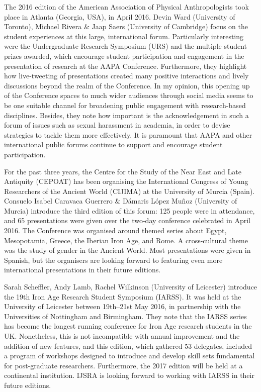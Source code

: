 \IJSRAseparator
{}
The 2016 edition of the American Association of Physical Anthropologists took place in Atlanta (Georgia, USA), in April 2016. 
Devin Ward (University of Toronto), Michael Rivera \& Jaap Saers (University of Cambridge) focus on the student experiences at this large, international forum. Particularly interesting were the Undergraduate Research Symposium (URS) and the multiple student prizes awarded, which encourage student participation and engagement in the presentation of research at the AAPA Conference. Furthermore, they highlight how live-tweeting of presentations created many positive interactions and lively discussions beyond the realm of the Conference. In my opinion, this opening up of the Conference spaces to much wider audiences through social media seems to be one suitable channel for broadening public engagement with research-based disciplines. Besides, they note how important is the acknowledgement in such a forum of issues such as sexual harassment in academia, in order to devise strategies to tackle them more effectively. It is paramount that AAPA and other international public forums continue to support and encourage student participation.

For the past three years, the Centre for the Study of the Near East and Late Antiquity (CEPOAT) has been organising the International Congress of Young Researchers of the Ancient World (CIJIMA) at the University of Murcia (Spain). Consuelo Isabel Caravaca Guerrero \& Dámaris López Muñoz (University of Murcia) introduce the third edition of this forum: 125 people were in attendance, and 65 presentations were given over the two-day conference celebrated in April 2016. The Conference was organised around themed series about Egypt, Mesopotamia, Greece, the Iberian Iron Age, and Rome. A cross-cultural theme was the study of gender in the Ancient World. Most presentations were given in Spanish, but the organisers are looking forward to featuring even more international presentations in their future editions.

Sarah Scheffler, Andy Lamb, Rachel Wilkinson (University of Leicester) introduce the 19th Iron Age Research Student Symposium (IARSS). It was held at the University of Leicester between 19th–21st May 2016, in partnership with the Universities of Nottingham and Birmingham. They note that the IARSS series has become the longest running conference for Iron Age research students in the UK. Nonetheless, this is not incompatible with annual improvement and the addition of new features, and this edition, which gathered 53 delegates, included a program of workshops designed to introduce and develop skill sets fundamental for post-graduate researchers. Furthermore, the 2017 edition will be held at a continental institution. IJSRA is looking forward to working with IARSS in their future editions.

